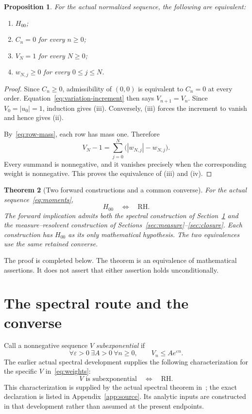 \documentclass[11pt,a4paper]{article}
\newtheorem{theorem}{Theorem}[section]
\newtheorem{proposition}[theorem]{Proposition}
\theoremstyle{definition}
\numberwithin{equation}{section}
\newcommand{\RH}{\mathrm{RH}}
\begin{document}
\begin{proposition}\label{prop:finite-equivalences}
For the actual normalized sequence, the following are equivalent:
\begin{enumerate}[label=(\roman*)]
 \item $H_{00}$;
 \item $C_n=0$ for every $n\ge0$;
 \item $V_N=1$ for every $N\ge0$;
 \item $w_{N,j}\ge0$ for every $0\le j\le N$.
\end{enumerate}
\end{proposition}
\begin{proof}
Since $C_n\ge0$, admissibility of $(0,0)$ is equivalent to $C_n=0$
at every order. Equation~\eqref{eq:variation-increment} then says
$V_{n+1}=V_n$. Since $V_0=|u_0|=1$, induction gives (iii).
Conversely, (iii) forces the increment to vanish and hence gives (ii).

By~\eqref{eq:row-mass}, each row has mass one. Therefore
\[
 V_N-1=\sum_{j=0}^N\bigl(|w_{N,j}|-w_{N,j}\bigr).
\]
Every summand is nonnegative, and it vanishes precisely when the
corresponding weight is nonnegative. This proves the equivalence of
(iii) and (iv).
\end{proof}

\begin{theorem}[Two forward constructions and a common converse]
\label{thm:main}
For the actual sequence~\eqref{eq:moments},
\[
 H_{00}\quad\Longleftrightarrow\quad\RH.
\]
The forward implication admits both the spectral construction of
Section~\ref{sec:spectral} and the measure--resolvent construction of
Sections~\ref{sec:measure}--\ref{sec:closure}. Each construction has
$H_{00}$ as its only mathematical hypothesis. The two equivalences use
the same retained converse.
\end{theorem}
The proof is completed below. The theorem is an equivalence of
mathematical assertions. It does not assert that either assertion holds
unconditionally.

\section{The spectral route and the converse}\label{sec:spectral}
Call a nonnegative sequence $V$ \emph{subexponential} if
\begin{equation}\label{eq:subexponential}
 \forall\varepsilon>0\ \exists A>0\ \forall n\ge0,\qquad
 V_n\le A e^{\varepsilon n}.
\end{equation}
The earlier actual spectral development supplies the following
characterization for the specific $V$ in~\eqref{eq:weights}:
\begin{equation}\label{eq:retained-spectral}
 V\text{ is subexponential}\quad\Longleftrightarrow\quad\RH.
\end{equation}
This characterization is supplied by the actual spectral theorem
in~\cite{source}; the exact declaration is listed in
Appendix~\ref{app:source}. Its analytic inputs are constructed in that
development rather than assumed at the present endpoints.
\end{document}
